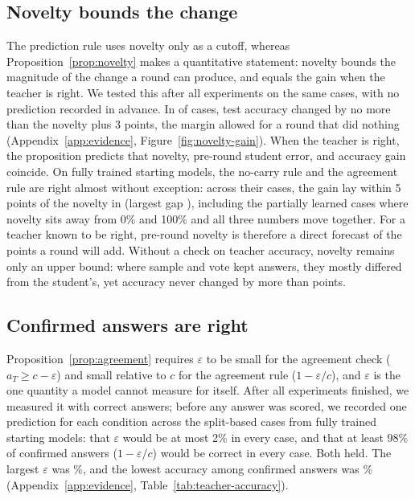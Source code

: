 \subsection{Novelty bounds the change}
\label{sec:novelty-bound}

The prediction rule uses novelty only as a cutoff, whereas
Proposition~\ref{prop:novelty} makes a quantitative statement: novelty bounds
the magnitude of the change a round can produce, and equals the gain when the
teacher is right. We tested this after all experiments on the same cases, with
no prediction recorded in advance. In \gpNovGainWithin{} of \gpNovGainCases{}
cases, test accuracy changed by no more than the novelty plus 3 points, the
margin allowed for a round that did nothing (Appendix~\ref{app:evidence},
Figure~\ref{fig:novelty-gain}). When the teacher is right, the proposition
predicts that novelty, pre-round student error, and accuracy gain coincide. On
fully trained starting models, the no-carry rule and the agreement rule are
right almost without exception: across their \gpNovGainSound{} cases, the gain
lay within 5 points of the novelty in \gpNovGainSoundChange{} (largest gap
\gpNovGainSoundChangeGap), including the \gpNovGainSoundBetween{} partially
learned cases where novelty sits away from 0\% and 100\% and all three numbers
move together. For a teacher known to be right, pre-round novelty is therefore
a direct forecast of the points a round will add. Without a check on teacher
accuracy, novelty remains only an upper bound: where sample and vote kept
answers, they mostly differed from the student's, yet accuracy never changed by
more than \gpNovGainVoteMax{} points.

\subsection{Confirmed answers are right}
\label{sec:confirmed-right}
\label{sec:agreement-filter}

Proposition~\ref{prop:agreement} requires $\varepsilon$ to be small for the
agreement check ($a_T \ge c - \varepsilon$) and small relative to $c$ for the
agreement rule ($1 - \varepsilon/c$), and $\varepsilon$ is the one quantity a
model cannot measure for itself. After all experiments finished, we measured it
with correct answers; before any answer was scored, we recorded one prediction
for each condition across the \gpTaFullCases{} split-based cases from fully
trained starting models: that $\varepsilon$ would be at most 2\% in every case,
and that at least 98\% of confirmed answers ($1 - \varepsilon/c$) would be
correct in every case. Both held. The largest $\varepsilon$ was
\gpTaPOneWorst\%, and the lowest accuracy among confirmed answers was
\gpTaPTwoWorst\% (Appendix~\ref{app:evidence},
Table~\ref{tab:teacher-accuracy}).

